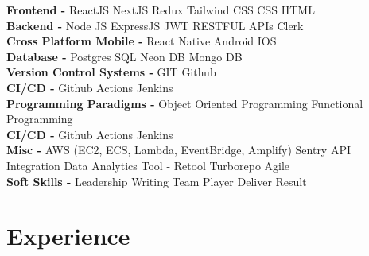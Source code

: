 \documentclass[]{deedy-resume-openfont}
\begin{document}
\begin{minipage}[t]{1.0\textwidth}
\large\textbf{Frontend - }
\textbullet{} ReactJS 
\textbullet{} NextJS
\textbullet{} Redux
\textbullet{} Tailwind CSS
\textbullet{} CSS
\textbullet{} HTML
\\
\large\textbf{Backend - }
\textbullet{} Node JS
\textbullet{} ExpressJS
\textbullet{} JWT
\textbullet{} RESTFUL APIs
\textbullet{} Clerk
\\
\large\textbf{Cross Platform Mobile - }
React Native 
\textbullet{} Android
\textbullet{} IOS
\\
\large\textbf{Database - }
\textbullet{} Postgres SQL
\textbullet{} Neon DB
\textbullet{} Mongo DB 
\\
\large\textbf{Version Control Systems - }
GIT
\textbullet{} Github
\\
\large\textbf{CI/CD - }
\textbullet{} Github Actions
\textbullet{} Jenkins
\\
\large\textbf{Programming Paradigms - }
\textbullet{} Object Oriented Programming
\textbullet{} Functional Programming
\\
\large\textbf{CI/CD - }
\textbullet{} Github Actions
\textbullet{} Jenkins
\\
\large\textbf{Misc - }
\textbullet{} AWS (EC2, ECS, Lambda, EventBridge, Amplify)
\textbullet{} Sentry
\textbullet{} API Integration
\textbullet{} Data Analytics Tool - Retool
\textbullet{} Turborepo
\textbullet{} Agile
\\
\large\textbf{Soft Skills - }
\textbullet{} Leadership
\textbullet{} Writing
\textbullet{} Team Player
\textbullet{} Deliver Result



\section{Experience}
\vspace{\topsep} %





\end{minipage}
\end{document}
